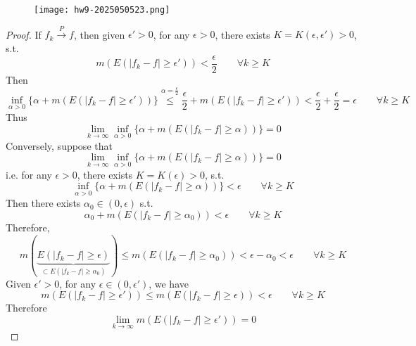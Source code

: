 \begin{exercise}
\begin{figure}[H]
\centering
\texttt{[image: hw9-2025050523.png]}
\label{}
\end{figure}
\end{exercise}
\begin{proof}
If $f_k\overset{ P }{ \to }f$, then given $\epsilon'>0$, for any $\epsilon>0$, there exists $K=K(\epsilon,\epsilon')>0$, s.t.
\[
m(E(\lvert f_k-f \rvert \geq \epsilon'))<\frac{\epsilon}{2} \qquad \forall k\geq K
\]
Then
\[
\inf_{\alpha>0}\{ \alpha+m(E(\lvert f_k-f \rvert \geq \epsilon')) \}\overset{ \alpha=\frac{\epsilon}{2} }{ \leq } \frac{\epsilon}{2}+m(E(\lvert f_k-f \rvert \geq \epsilon'))<\frac{\epsilon}{2}+\frac{\epsilon}{2}=\epsilon \qquad \forall k\geq K
\]
Thus
\[
\lim_{ k \to \infty } \inf_{\alpha>0}\{ \alpha+m(E(\lvert f_k-f \rvert \geq \alpha)) \}=0
\]
Conversely, suppose that
\[
\lim_{ k \to \infty } \inf_{\alpha>0}\{ \alpha+m(E(\lvert f_k-f \rvert \geq \alpha)) \}=0
\]
i.e. for any $\epsilon>0$, there exists $K=K(\epsilon)>0$, s.t.
\[
\inf_{\alpha>0}\{ \alpha+m(E(\lvert f_k-f \rvert \geq \alpha)) \}<\epsilon \qquad \forall k\geq K
\]
Then there exists $\alpha_0\in(0,\epsilon)$ s.t.
\[
\alpha_0+m(E(\lvert f_k-f \rvert \geq \alpha_0))<\epsilon \qquad \forall k\geq K
\]
Therefore,
\[
m(\underbrace{ E(\lvert f_k-f \rvert \geq \epsilon) }_{ \subset E(\lvert f_k-f \rvert \geq \alpha_0) })\leq m(E(\lvert f_k-f \rvert \geq \alpha_0))<\epsilon-\alpha_0<\epsilon \qquad \forall k\geq K
\]
Given $\epsilon'>0$, for any $\epsilon\in(0,\epsilon')$, we have
\[
m(E(\lvert f_k-f \rvert \geq \epsilon'))\leq m(E(\lvert f_k-f \rvert \geq \epsilon))<\epsilon \qquad \forall k\geq K
\]
Therefore
\[
\lim_{ k \to \infty } m(E(\lvert f_k-f \rvert \geq \epsilon'))=0
\]
\end{proof}

